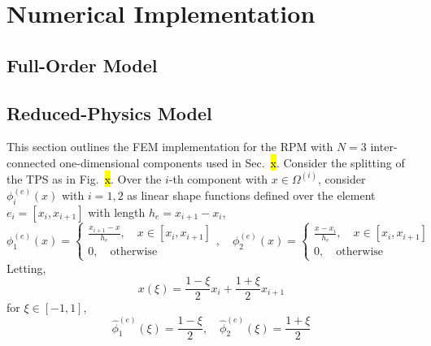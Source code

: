 \appendix

\section{Numerical Implementation}\label{app_implementation}

\subsection{Full-Order Model}

\subsection{Reduced-Physics Model}

This section outlines the FEM implementation for the RPM with $N=3$ inter-connected one-dimensional components used in Sec.~\hl{x}. Consider the splitting of the TPS as in Fig.~\hl{x}. Over the $i$-th component with $x\in\Omega^{(i)}$, consider $\phi^{(e)}_i(x)$ with $i=1,2$ as linear shape functions defined over the element $e_i=[x_{i},x_{i+1}]$ with length $h_e=x_{i+1} - x_i$,
\begin{equation}
    \phi^{(e)}_1(x) = \left\{\begin{matrix}
        \frac{x_{i+1} - x}{h_e},\quad x\in[x_i,x_{i+1}]\\
        0, \quad \text{otherwise}
    \end{matrix}\right.,\quad\phi^{(e)}_2(x) = \left\{\begin{matrix}
        \frac{x - x_i}{h_e},\quad x\in[x_i,x_{i+1}]\\
        0, \quad \text{otherwise}
    \end{matrix}\right.
\end{equation}
Letting,
\[
    x(\xi) = \frac{1-\xi}{2}x_i + \frac{1 + \xi}{2}x_{i+1}
\]
for $\xi\in[-1,1]$,
\begin{equation}
    \hat{\phi}_1^{(e)}(\xi) = \frac{1 - \xi}{2},\quad \hat{\phi}_2^{(e)}(\xi) = \frac{1 + \xi}{2}
\end{equation}


